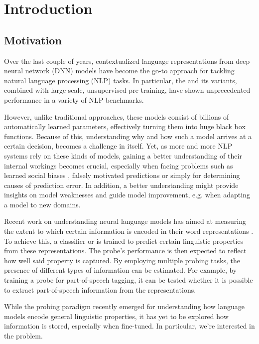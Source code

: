 \chapter{Introduction}
\section{Motivation}
Over the last couple of years, contextualized language representations from deep neural network (DNN) models have become the go-to approach for tackling natural language processing (NLP) tasks. In particular, the  \cite{vaswani2017attention} and its variants, combined with large-scale, unsupervised pre-training, have shown unprecedented performance in a variety of NLP benchmarks.

However, unlike traditional approaches, these models consist of billions of automatically learned parameters, effectively turning them into huge black box functions. Because of this, understanding why and how such a model arrives at a certain decision, becomes a challenge in itself. Yet, as more and more NLP systems rely on these kinds of models, gaining a better understanding of their internal workings becomes crucial, especially when facing problems such as learned social biases \cite{Nadeem2021StereoSetMS,Bender2021OnTD, kurita2019measuring}, falsely motivated predictions \cite{10.1145/2939672.2939778, DBLP:journals/corr/abs-1802-00614} or simply for determining causes of prediction error. In addition, a better understanding might provide insights on model weaknesses and guide model improvement, e.g. when adapting a model to new domains.

Recent work on understanding neural language models has aimed at measuring the extent to which certain information is encoded in their word representations \cite{tenney-etal-2019-bert,Tenney2019WhatDY,DBLP:journals/corr/abs-1909-03368}. To achieve this, a  classifier or  is trained to predict certain linguistic properties from these representations. The probe's performance is then expected to reflect how well said property is captured. By employing multiple probing tasks, the presence of different types of information can be estimated. For example, by training a probe for part-of-speech tagging, it can be tested whether it is possible to extract part-of-speech information from the representations.

While the probing paradigm recently emerged for understanding how language models encode general linguistic properties, it has yet to be explored how  information is stored, especially when fine-tuned. In particular, we're interested in the  problem.


